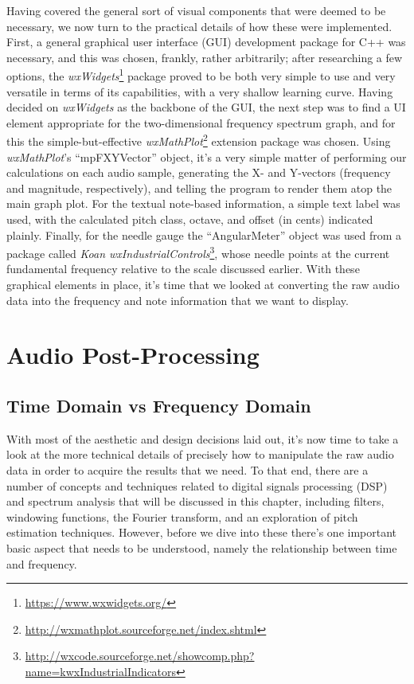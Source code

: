 \documentclass[12pt]{report}
\begin{document}
\indent Having covered the general sort of visual components that were deemed to be necessary, we now turn to the practical details of how these were implemented. First, a general graphical user interface (GUI) development package for C++ was necessary, and this was chosen, frankly, rather arbitrarily; after researching a few options, the \emph{wxWidgets}\footnote{\url{https://www.wxwidgets.org/}} package proved to be both very simple to use and very versatile in terms of its capabilities, with a very shallow learning curve. Having decided on \emph{wxWidgets} as the backbone of the GUI, the next step was to find a UI element appropriate for the two-dimensional frequency spectrum graph, and for this the simple-but-effective \emph{wxMathPlot}\footnote{\url{http://wxmathplot.sourceforge.net/index.shtml}} extension package was chosen. Using \emph{wxMathPlot}'s ``mpFXYVector'' object, it's a very simple matter of performing our calculations on each audio sample, generating the X- and Y-vectors (frequency and magnitude, respectively), and telling the program to render them atop the main graph plot. For the textual note-based information, a simple text label was used, with the calculated pitch class, octave, and offset (in cents) indicated plainly. Finally, for the needle gauge the ``AngularMeter'' object was used from a package called \emph{Koan wxIndustrialControls}\footnote{\url{http://wxcode.sourceforge.net/showcomp.php?name=kwxIndustrialIndicators}}, whose needle points at the current fundamental frequency relative to the scale discussed earlier. With these graphical elements in place, it's time that we looked at converting the raw audio data into the frequency and note information that we want to display.


\chapter{Audio Post-Processing}
\section{Time Domain vs Frequency Domain}
\indent With most of the aesthetic and design decisions laid out, it's now time to take a look at the more technical details of precisely how to manipulate the raw audio data in order to acquire the results that we need. To that end, there are a number of concepts and techniques related to digital signals processing (DSP) and spectrum analysis that will be discussed in this chapter, including filters, windowing functions, the Fourier transform, and an exploration of pitch estimation techniques. However, before we dive into these there's one important basic aspect that needs to be understood, namely the relationship between time and frequency. 
\end{document}
